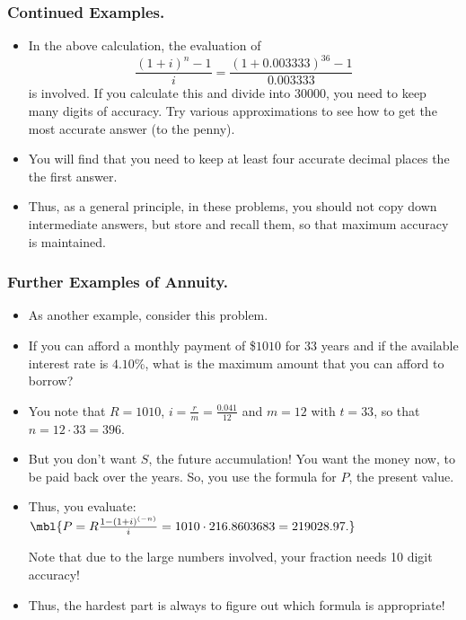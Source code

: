 %


\begin{frame}%
  \frametitle{Continued Examples.}
  \begin{itemize}%

\item {}
In the above calculation, the evaluation of
$$\frac{(1+i)^n -1}{i} = \frac{(1+0.003333)^{36} -1}{0.003333}$$
is involved. If you calculate this and divide into $30000$, you need to
keep many digits of accuracy. Try various approximations to see how to
get the most accurate answer (to the penny).

\item You will find that you need to keep at least four accurate decimal
places the the first answer.

\item Thus, as a general principle, in these problems, you should not
copy down intermediate answers, but store and recall them, so that
maximum accuracy is maintained.

\end{itemize}
\end{frame}
%


\begin{frame}%
  \frametitle{Further Examples of Annuity.}
  \begin{itemize}%
\item
As another example, consider this problem.

\item If you can afford a monthly payment of \$$1010$ for $33$ years and
if the available
interest rate is $4.10$\%, what is the maximum amount
that you can afford to borrow?

\item You note that $R=1010$, $i=\frac{r}{m}=\frac{0.041}{12}$ and
$m=12$ with $t=33$, so that $n=12\cdot 33 = 396$.

\item But you don't want $S$, the future accumulation! You want the
money now, to be paid back over the years. So, you use the formula for
$P$, the present value.

\item Thus, you evaluate:
$\mbl{P = R\frac{1-(1+i)^{(-n)}}{i} = 1010\cdot 216.8603683 = 219028.97.}$

Note that due to the large numbers involved, your fraction needs 10
digit accuracy!

\item Thus, the hardest part is always to figure out which formula is
appropriate!
\end{itemize}
\end{frame}
%

